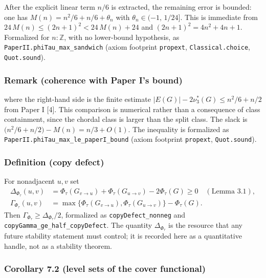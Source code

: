 \documentclass[english,11pt,a4paper]{article}
\begin{document}
After the explicit linear term \(n/6\) is extracted, the remaining error
is bounded: one has \(M(n)=n^2/6+n/6+\theta_n\) with
\(\theta_n\in(-1,\,1/24]\). This is immediate from
\(24\,M(n)\le(2n+1)^2<24\,M(n)+24\) and \((2n+1)^2=4n^2+4n+1\).
Formalized for \(n:\mathbb Z\), with no lower-bound hypothesis, as
\nolinkurl{PaperII.phiTau_max_sandwich} (axiom footprint
\nolinkurl{propext}, \nolinkurl{Classical.choice}, \nolinkurl{Quot.sound}).

\subsubsection{Remark (coherence with Paper I's
bound)}\label{remark-coherence-with-paper-is-bound}

where the right-hand side is the finite estimate
\(|E(G)|-2\nu_3^*(G)\le n^2/6+n/2\) from Paper I {[}4{]}. This
comparison is numerical rather than a consequence of class containment,
since the chordal class is larger than the split class. The slack is
\(\bigl(n^2/6+n/2\bigr)-M(n)=n/3+O(1)\). The inequality is formalized as
\nolinkurl{PaperII.phiTau_max_le_paperI_bound} (axiom footprint
\nolinkurl{propext}, \nolinkurl{Quot.sound}).

\subsubsection{Definition (copy defect)}\label{definition-copy-defect}

For nonadjacent \(u,v\) set \[
\begin{aligned}
\Delta_{\Phi_\tau}(u,v)
&=\Phi_\tau(G_{v\to u})+\Phi_\tau(G_{u\to v})-2\Phi_\tau(G)\ge0
\quad(\text{Lemma 3.1}),\\
\Gamma_{\Phi_\tau}(u,v)
&=\max\{\Phi_\tau(G_{v\to u}),\Phi_\tau(G_{u\to v})\}-\Phi_\tau(G).
\end{aligned}
\] Then \(\Gamma_{\Phi_\tau}\ge\Delta_{\Phi_\tau}/2\), formalized as
\nolinkurl{copyDefect_nonneg} and
\nolinkurl{copyGamma_ge_half_copyDefect}. The quantity
\(\Delta_{\Phi_\tau}\) is the resource that any future stability
statement must control; it is recorded here as a quantitative handle,
not as a stability theorem.

\subsubsection{Corollary 7.2 (level sets of the cover
functional)}\label{corollary-7.2-level-sets-of-the-cover-functional}
\end{document}
